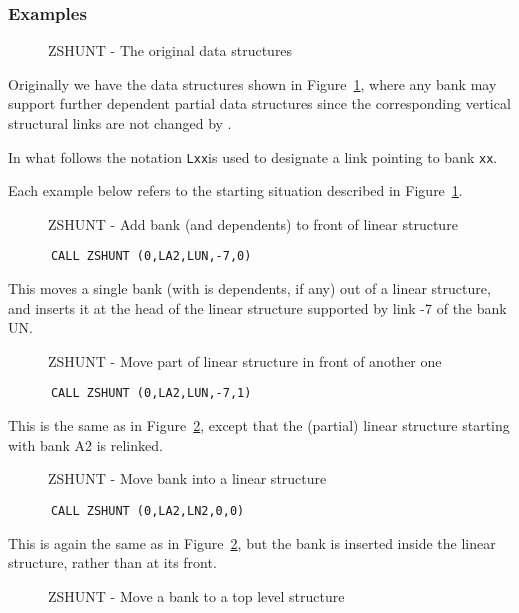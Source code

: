 \subsubsection{Examples}
\begin{figure}
\caption{ZSHUNT - The original data structures}
\label{FSHUNT1}
\end{figure}
\par Originally we have the data structures shown in
Figure~\ref{FSHUNT1}, where any bank may support further
dependent partial data structures since
the corresponding vertical structural links are not changed by .
\par In what follows the notation {\tt Lxx}is used to designate
a link pointing to bank {\tt xx}.
\par Each example below
refers to the starting situation described in Figure~\ref{FSHUNT1}.
\begin{figure}
\caption{ZSHUNT - Add bank (and dependents) to front of linear structure}
\label{FSHUNT2}
\end{figure}
\begin{verbatim}
      CALL ZSHUNT (0,LA2,LUN,-7,0)
\end{verbatim}
\par This moves a single bank (with is dependents, if any) out of
a linear structure, and inserts it at the head of the linear
structure supported by link -7 of the bank UN.
\begin{figure}
\caption{ZSHUNT - Move part of linear structure in front of another one}
\label{FSHUNT3}
\end{figure}
\begin{verbatim}
      CALL ZSHUNT (0,LA2,LUN,-7,1)
\end{verbatim}
\par This is the same as in Figure~\ref{FSHUNT2},
except that the (partial) linear
structure starting with bank A2 is relinked.
\begin{figure}
\caption{ZSHUNT - Move bank into a linear structure}
\label{FSHUNT4}
\end{figure}
\begin{verbatim}
      CALL ZSHUNT (0,LA2,LN2,0,0)
\end{verbatim}
\par This is again the same as in Figure~\ref{FSHUNT2},
but the bank is inserted inside the linear structure,
rather than at its front.
\begin{figure}
\caption{ZSHUNT - Move a bank to a top level structure}
\label{FSHUNT5}
\end{figure}
